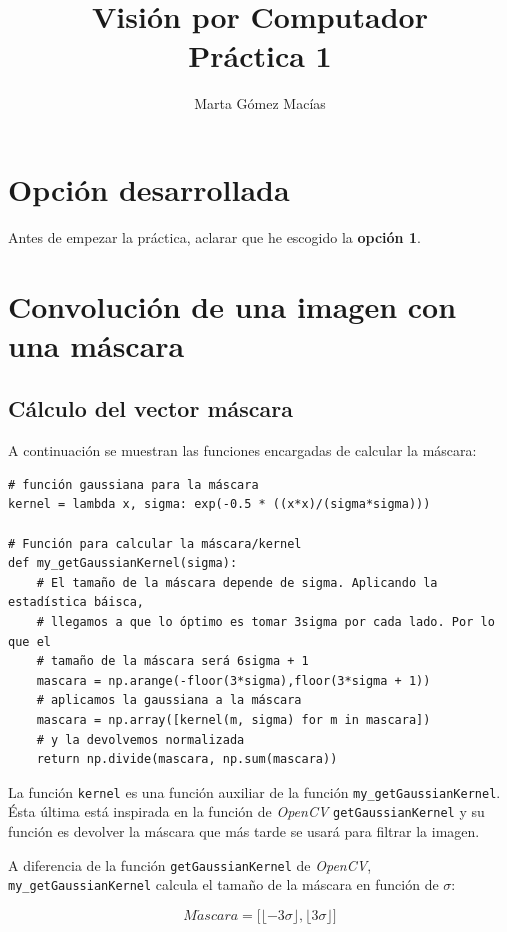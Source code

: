 \documentclass[11pt,a4paper]{article}
\title{\Huge{Visión por Computador} \\ Práctica 1}
\author{Marta Gómez Macías}
\theoremstyle{plain}
\theoremstyle{definition}
\begin{document}
\maketitle

\tableofcontents

\section{Opción desarrollada}

Antes de empezar la práctica, aclarar que he escogido la \textbf{opción 1}.

\section{Convolución de una imagen con una máscara}
\subsection{Cálculo del vector máscara}

A continuación se muestran las funciones encargadas de calcular la máscara:

\begin{verbatim}
# función gaussiana para la máscara
kernel = lambda x, sigma: exp(-0.5 * ((x*x)/(sigma*sigma)))

# Función para calcular la máscara/kernel
def my_getGaussianKernel(sigma):
    # El tamaño de la máscara depende de sigma. Aplicando la estadística báisca, 
    # llegamos a que lo óptimo es tomar 3sigma por cada lado. Por lo que el 
    # tamaño de la máscara será 6sigma + 1
    mascara = np.arange(-floor(3*sigma),floor(3*sigma + 1))
    # aplicamos la gaussiana a la máscara
    mascara = np.array([kernel(m, sigma) for m in mascara])
    # y la devolvemos normalizada
    return np.divide(mascara, np.sum(mascara))
\end{verbatim}

La función \texttt{kernel} es una función auxiliar de la función \texttt{my\_getGaussianKernel}. Ésta última está inspirada en la función de \textit{OpenCV} \texttt{getGaussianKernel} y su función es devolver la máscara que más tarde se usará para filtrar la imagen.

A diferencia de la función \texttt{getGaussianKernel} de \textit{OpenCV}, \texttt{my\_getGaussianKernel} calcula el tamaño de la máscara en función de $\sigma$:

\begin{displaymath}
 M\acute{a}scara = \bigg[\lfloor-3\sigma\rfloor,\lfloor3\sigma\rfloor\bigg]
\end{displaymath}
\end{document}
